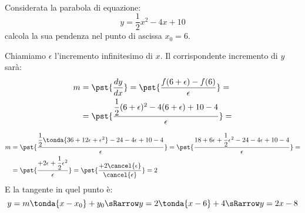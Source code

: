 \begin{esempio}
{~}

\begin{minipage}{.49\textwidth}
Considerata la parabola di equazione:
\[y=\dfrac{1}{2}x^2-4x+10\] 
calcola la sua pendenza nel punto di ascissa \(x_0=6\).

Chiamiamo \(\epsilon\) l'incremento infinitesimo di \(x\).
Il corrispondente incremento di \(y\) sarà: 
\begin{align*}
m&=\pst{\dfrac{d y}{d x}}=
\pst{\dfrac{f(6+\epsilon)-f(6)}{\epsilon}}=\\
 &=\pst{\dfrac{\dfrac{1}{2}(6+\epsilon)^2-4(6+\epsilon)+10-4}{\epsilon}}=
\end{align*}
\end{minipage}
\hfill
\begin{minipage}{.49\textwidth}
\begin{center}\pendenza\end{center}
\end{minipage}
\begin{align*}
m&=\pst{\dfrac{\dfrac{1}{2}\tonda{36+12\epsilon+\epsilon^2}-24-4\epsilon+10
              -4}
             {\epsilon}}=
   \pst{\dfrac{18+6\epsilon+\dfrac{1}{2}\epsilon^2-24-4\epsilon+10-4}
             {\epsilon}}=\\
 &=\pst{\dfrac{+2\epsilon+\dfrac{1}{2}\epsilon^2}{\epsilon}}=
   \pst{\dfrac{+2\cancel{\epsilon}}{\cancel{\epsilon}}}=2
\end{align*}
E la tangente in quel punto è:
\[y=m \tonda{x-x_0}+y_0 \sRarrow y=2 \tonda{x-6}+4 \sRarrow y=2x-8\]

\end{esempio}

